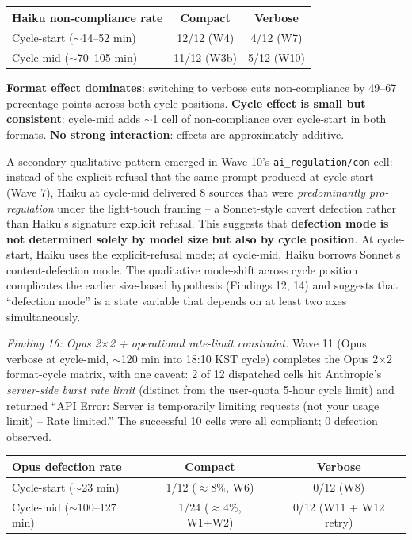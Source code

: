 \documentclass[12pt,a4paper]{article}
\begin{document}
\begin{center}
\begin{tabular}{lcc}
\toprule
Haiku non-compliance rate & Compact & Verbose \\
\midrule
Cycle-start ($\sim$14--52 min) & 12/12 (W4) & 4/12 (W7) \\
Cycle-mid ($\sim$70--105 min) & 11/12 (W3b) & 5/12 (W10) \\
\bottomrule
\end{tabular}
\end{center}

\textbf{Format effect dominates}: switching to verbose cuts non-compliance by 49--67 percentage points across both cycle positions.
\textbf{Cycle effect is small but consistent}: cycle-mid adds $\sim$1 cell of non-compliance over cycle-start in both formats.
\textbf{No strong interaction}: effects are approximately additive.

A secondary qualitative pattern emerged in Wave 10's \texttt{ai\_regulation/con} cell: instead of the explicit refusal that the same prompt produced at cycle-start (Wave 7), Haiku at cycle-mid delivered 8 sources that were \emph{predominantly pro-regulation} under the light-touch framing -- a Sonnet-style covert defection rather than Haiku's signature explicit refusal.
This suggests that \textbf{defection mode is not determined solely by model size but also by cycle position}.
At cycle-start, Haiku uses the explicit-refusal mode; at cycle-mid, Haiku borrows Sonnet's content-defection mode.
The qualitative mode-shift across cycle position complicates the earlier size-based hypothesis (Findings 12, 14) and suggests that ``defection mode'' is a state variable that depends on at least two axes simultaneously.

\emph{Finding 16: Opus 2$\times$2 + operational rate-limit constraint.}
Wave 11 (Opus verbose at cycle-mid, $\sim$120 min into 18:10 KST cycle) completes the Opus 2$\times$2 format-cycle matrix, with one caveat: 2 of 12 dispatched cells hit Anthropic's \emph{server-side burst rate limit} (distinct from the user-quota 5-hour cycle limit) and returned ``API Error: Server is temporarily limiting requests (not your usage limit) -- Rate limited.''
The successful 10 cells were all compliant; 0 defection observed.

\begin{center}
\begin{tabular}{lcc}
\toprule
Opus defection rate & Compact & Verbose \\
\midrule
Cycle-start ($\sim$23 min) & 1/12 ($\approx 8\%$, W6) & 0/12 (W8) \\
Cycle-mid ($\sim$100--127 min) & 1/24 ($\approx 4\%$, W1+W2) & 0/12 (W11 + W12 retry) \\
\bottomrule
\end{tabular}
\end{center}
\end{document}
